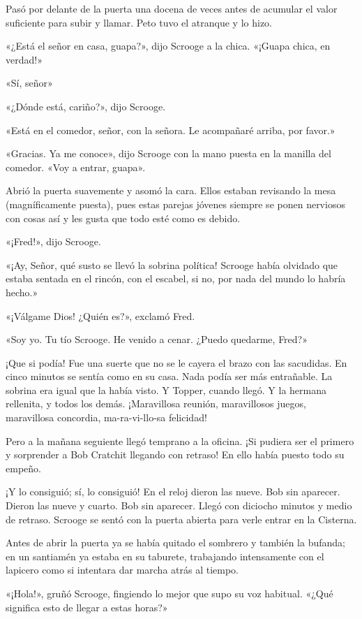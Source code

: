 \documentclass{novela}
\begin{document}
 Pasó por delante de la puerta una docena de veces antes de acumular el valor suficiente para subir y llamar. Peto tuvo el atranque y lo hizo.

 «¿Está el señor en casa, guapa?», dijo Scrooge a la chica. «¡Guapa chica, en verdad!»

 «Sí, señor»

 «¿Dónde está, cariño?», dijo Scrooge.

 «Está en el comedor, señor, con la señora. Le acompañaré arriba, por favor.»

 «Gracias. Ya me conoce», dijo Scrooge con la mano puesta en la manilla del comedor. «Voy a entrar, guapa».

 Abrió la puerta suavemente y asomó la cara. Ellos estaban revisando la mesa (magníficamente puesta), pues estas parejas jóvenes siempre se ponen nerviosos con cosas así y les gusta que todo esté como es debido.

 «¡Fred!», dijo Scrooge.

 «¡Ay, Señor, qué susto se llevó la sobrina política! Scrooge había olvidado que estaba sentada en el rincón, con el escabel, si no, por nada del mundo lo habría hecho.»

 «¡Válgame Dios! ¿Quién es?», exclamó Fred.

 «Soy yo. Tu tío Scrooge. He venido a cenar. ¿Puedo quedarme, Fred?»

 ¡Que si podía! Fue una suerte que no se le cayera el brazo con las sacudidas. En cinco minutos se sentía como en su casa. Nada podía ser más entrañable. La sobrina era igual que la había visto. Y Topper, cuando llegó. Y la hermana rellenita, y todos los demás. ¡Maravillosa reunión, maravillosos juegos, maravillosa concordia, ma-ra-vi-llo-sa felicidad!

 Pero a la mañana seguiente llegó temprano a la oficina. ¡Si pudiera ser el primero y sorprender a Bob Cratchit llegando con retraso! En ello había puesto todo su empeño.

 ¡Y lo consiguió; sí, lo consiguió! En el reloj dieron las nueve. Bob sin aparecer. Dieron las nueve y cuarto. Bob sin aparecer. Llegó con diciocho minutos y medio de retraso. Scrooge se sentó con la puerta abierta para verle entrar en la Cisterna.

 Antes de abrir la puerta ya se había quitado el sombrero y también la bufanda; en un santiamén ya estaba en su taburete, trabajando intensamente con el lapicero como si intentara dar marcha atrás al tiempo.

 «¡Hola!», gruñó Scrooge, fingiendo lo mejor que supo su voz habitual. «¿Qué significa esto de llegar a estas horas?»
\end{document}

